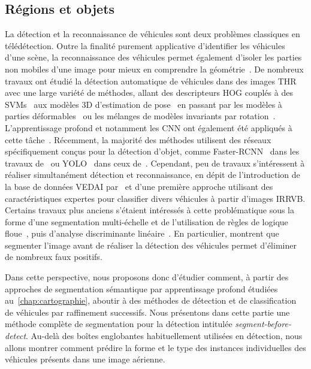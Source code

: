 \subsection{Régions et objets}

La détection et la reconnaissance de véhicules sont deux problèmes classiques en télédétection. Outre la finalité purement applicative d'identifier les véhicules d'une scène, la reconnaissance des véhicules permet également d'isoler les parties non mobiles d'une image pour mieux en comprendre la géométrie~\cite{leberl_recognizing_2007}. De nombreux travaux ont étudié la détection automatique de véhicules dans des images \gls{THR} avec une large variété de méthodes, allant des descripteurs \gls{HOG} couplés à des \glspl{SVM}~\cite{michel_local_2011,gleason_vehicle_2011,kamenetsky_aerial_2015} aux modèles 3D d'estimation de pose~\cite{janney_pose-invariant_2015} en passant par les modèles à parties déformables~\cite{randrianarivo_urban_2013} ou les mélanges de modèles invariants par rotation~\cite{randrianarivo_contextual_2016}. L'apprentissage profond et notamment les \gls{CNN} ont également été appliqués à cette tâche~\cite{chen_vehicle_2014}. Récemment, la majorité des méthodes utilisent des réseaux spécifiquement conçus pour la détection d'objet, comme Faster-RCNN~\cite{ren_faster_2017} dans les travaux de~\citet{sommer_fast_2017} ou YOLO~\cite{redmon_you_2016} dans ceux de~\citet{van_etten_you_2018}. Cependant, peu de travaux s'intéressent à réaliser simultanément détection et reconnaissance, en dépit de l'introduction de la base de données \gls{VEDAI} par~\citet{razakarivony_vehicle_2016} et d'une première approche utilisant des caractéristiques expertes pour classifier divers véhicules à partir d'images \gls{IRRVB}. Certains travaux plus anciens s'étaient intéressés à cette problématique sous la forme d'une segmentation multi-échelle et de l'utilisation de règles de logique floue~\cite{holt_object-based_2009}, puis d'analyse discriminante linéaire~\cite{eikvil_classification-based_2009}. En particulier, \citet{eikvil_classification-based_2009} montrent que segmenter l'image avant de réaliser la détection des véhicules permet d'éliminer de nombreux faux positifs.

Dans cette perspective, nous proposons donc d'étudier comment, à partir des approches de segmentation sémantique par apprentissage profond étudiées au~\cref{chap:cartographie}, aboutir à des méthodes de détection et de classification de véhicules par raffinement successifs. Nous présentons dans cette partie une méthode complète de segmentation pour la détection intitulée \emph{segment-before-detect}. Au-delà des boîtes englobantes habituellement utilisées en détection, nous allons montrer comment prédire la forme et le type des instances individuelles des véhicules présents dans une image aérienne.


